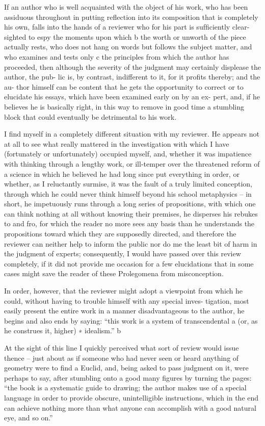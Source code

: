 If an author who is well acquainted with the object of his work, who
has been assiduous throughout in putting reﬂection into its composition
that is completely his own, falls into the hands of a reviewer who for
his part is sufﬁciently clear-sighted to espy the moments upon which b
the worth or unworth of the piece actually rests, who does not hang on
words but follows the subject matter, and who examines and tests only c
the principles from which the author has proceeded, then although the
severity of the judgment may certainly displease the author, the pub-
lic is, by contrast, indifferent to it, for it proﬁts thereby; and the au-
thor himself can be content that he gets the opportunity to correct or
to elucidate his essays, which have been examined early on by an ex-
pert, and, if he believes he is basically right, in this way to remove in
good time a stumbling block that could eventually be detrimental to his
work.

I ﬁnd myself in a completely different situation with my reviewer.
He appears not at all to see what really mattered in the investigation
with which I have (fortunately or unfortunately) occupied myself, and,
whether it was impatience with thinking through a lengthy work, or
ill-temper over the threatened reform of a science in which he believed
he had long since put everything in order, or whether, as I reluctantly
surmise, it was the fault of a truly limited conception, through which he
could never think himself beyond his school metaphysics – in short, he
impetuously runs through a long series of propositions, with which one
can think nothing at all without knowing their premises, he disperses his
rebukes to and fro, for which the reader no more sees any basis than he
understands the propositions toward which they are supposedly directed,
and therefore the reviewer can neither help to inform the public nor do
me the least bit of harm in the judgment of experts; consequently, I would
have passed over this review completely, if it did not provide me occasion
for a few elucidations that in some cases might save the reader of these
Prolegomena from misconception.

In order, however, that the reviewer might adopt a viewpoint from
which he could, without having to trouble himself with any special inves-
tigation, most easily present the entire work in a manner disadvantageous
to the author, he begins and also ends by saying: “this work is a system
of transcendental a (or, as he construes it, higher) ∗ idealism.” b

At the sight of this line I quickly perceived what sort of review would
issue thence – just about as if someone who had never seen or heard
anything of geometry were to ﬁnd a Euclid, and, being asked to pass
judgment on it, were perhaps to say, after stumbling onto a good many
ﬁgures by turning the pages: “the book is a systematic guide to drawing;
the author makes use of a special language in order to provide obscure,
unintelligible instructions, which in the end can achieve nothing more
than what anyone can accomplish with a good natural eye, and so on.”

